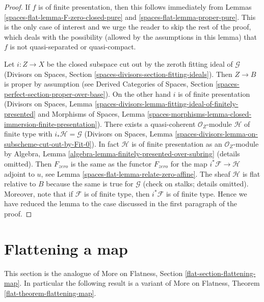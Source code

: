 \begin{proof}
If $f$ is of finite presentation, then this follows immediately from
Lemmas \ref{spaces-flat-lemma-F-zero-closed-pure} and \ref{spaces-flat-lemma-proper-pure}.
This is the only case of interest and we urge the reader to skip
the rest of the proof, which deals with the possibility (allowed
by the assumptions in this lemma)
that $f$ is not quasi-separated or quasi-compact.

\medskip\noindent
Let $i : Z \to X$ be the closed subspace cut out by the zeroth
fitting ideal of $\mathcal{G}$
(Divisors on Spaces, Section
\ref{spaces-divisors-section-fitting-ideals}).
Then $Z \to B$ is proper by assumption (see
Derived Categories of Spaces, Section
\ref{spaces-perfect-section-proper-over-base}).
On the other hand $i$ is of finite presentation
(Divisors on Spaces, Lemma
\ref{spaces-divisors-lemma-fitting-ideal-of-finitely-presented} and
Morphisms of Spaces, Lemma
\ref{spaces-morphisms-lemma-closed-immersion-finite-presentation}).
There exists a quasi-coherent $\mathcal{O}_Z$-module
$\mathcal{H}$ of finite type with $i_*\mathcal{H} = \mathcal{G}$
(Divisors on Spaces, Lemma
\ref{spaces-divisors-lemma-on-subscheme-cut-out-by-Fit-0}).
In fact $\mathcal{H}$ is of finite presentation as an $\mathcal{O}_Z$-module
by Algebra, Lemma \ref{algebra-lemma-finitely-presented-over-subring}
(details omitted).
Then $F_{zero}$ is the same as the functor $F_{zero}$
for the map $i^*\mathcal{F} \to \mathcal{H}$ adjoint to $u$, see
Lemma \ref{spaces-flat-lemma-relate-zero-affine}.
The sheaf $\mathcal{H}$ is flat relative to $B$ because
the same is true for $\mathcal{G}$ (check on stalks; details omitted).
Moreover, note that if $\mathcal{F}$ is of finite type,
then $i^*\mathcal{F}$ is of finite type.
Hence we have reduced the lemma to the case
discussed in the first paragraph of the proof.
\end{proof}

\section{Flattening a map}
\label{spaces-flat-section-flattening-map}
This section is the analogue of
More on Flatness, Section \ref{flat-section-flattening-map}.
In particular the following result is a variant of
More on Flatness, Theorem \ref{flat-theorem-flattening-map}.

